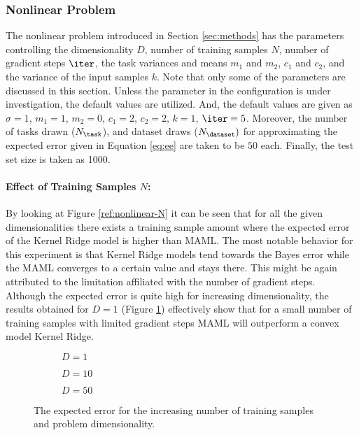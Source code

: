 \subsubsection{Nonlinear Problem}

The nonlinear problem introduced in Section \ref{sec:methods} has the parameters controlling the dimensionality $D$, number of training samples $N$, number of gradient steps $\iter$, the task variances and means $m_1$ and $m_2$, $c_1$ and $c_2$, and the variance of the input samples $k$. Note that only some of the parameters are discussed in this section. Unless the parameter in the configuration is under investigation, the default values are utilized. And, the default values are given as $\sigma=1$, $m_1=1$, $m_2=0$, $c_1=2$, $c_2=2$, $k=1$, $\iter=5$. Moreover, the number of tasks drawn ($N_{\task}$), and dataset draws ($N_{\dataset})$  for approximating the expected error given in Equation \ref{eq:ee} are taken to be $50$ each. Finally, the test set size is taken as 1000.

\paragraph{Effect of Training Samples $N$:} By looking at Figure \ref{ref:nonlinear-N} it can be seen that for all the given dimensionalities there exists a training sample amount where the expected error of the Kernel Ridge model is higher than MAML. The most notable behavior for this experiment is that Kernel Ridge models tend towards the Bayes error while the MAML converges to a certain value and stays there. This might be again attributed to the limitation affiliated with the number of gradient steps. Although the expected error is quite high for increasing dimensionality, the results obtained for $D=1$ (Figure \ref{fig:nonlinear-N-D-1}) effectively show that for a small number of training samples with limited gradient steps MAML will outperform a convex model Kernel Ridge.

\begin{figure}[!h]
  \centering
    \begin{subfigure}{0.3\textwidth}
      \centering
      \caption{$D=1$}
      \label{fig:nonlinear-N-D-1}
    \end{subfigure}
    \begin{subfigure}{0.3\textwidth}
      \centering
      \caption{$D=10$}
      \label{fig:nonlinear-N-D-10}
    \end{subfigure}
    \begin{subfigure}{0.3\textwidth}
      \centering
      \caption{$D=50$}
      \label{fig:nonlinear-N-D-50}
    \end{subfigure}
  \caption{The expected error for the increasing number of training samples and problem dimensionality.}\label{fig:nonlinear-N}
\end{figure}


